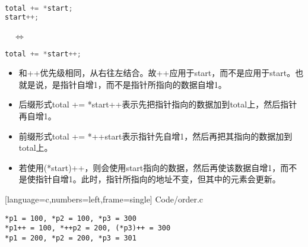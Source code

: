 \begin{frame}[fragile]
\begin{minipage}{0.4\textwidth}
\begin{lstlisting}[language=c,backgroundcolor=\color{red!20}]
total += *start;
start++;
\end{lstlisting}
\end{minipage}
~~$\Longleftrightarrow$~~
\begin{minipage}{0.4\textwidth}
\begin{lstlisting}[language=c,backgroundcolor=\color{red!20}]
total += *start++;
\end{lstlisting}
\end{minipage}
\begin{itemize}
\item
{\tf *}和{\tf ++}优先级相同，从右往左结合。故{\tf ++}应用于{\tf start}，而不是应用于{\tf *start}。也就是说，是指针自增1，而不是指针所指向的数据自增1。 \\[0.1in]\pause 
\item
后缀形式{\tf total += *start++}表示先把指针指向的数据加到{\tf total}上，然后指针再自增1。\\[0.1in]\pause
\item
前缀形式{\tf total += *++start}表示指针先自增1，然后再把其指向的数据加到{\tf total}上。\\[0.1in]\pause
\item
若使用{\tf (*start)++}，则会使用{\tf start}指向的数据，然后再使该数据自增1，而不是使指针自增1。此时，指针所指向的地址不变，但其中的元素会更新。
\end{itemize}
\end{frame}

\begin{frame}

[language=c,numbers=left,frame=single]
{Code/order.c}
\end{frame}

\begin{frame}[fragile]
\begin{lstlisting}[backgroundcolor=\color{red!20}]
*p1 = 100, *p2 = 100, *p3 = 300
*p1++ = 100, *++p2 = 200, (*p3)++ = 300
*p1 = 200, *p2 = 200, *p3 = 301
\end{lstlisting}
\end{frame}

